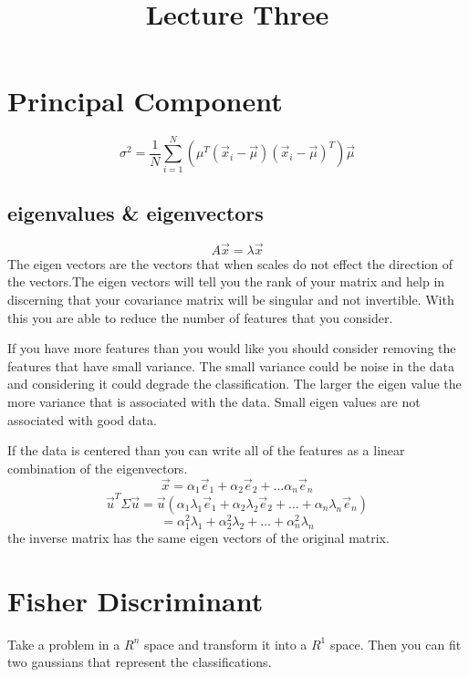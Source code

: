 \documentclass[letter, 9pt]{article}
\title{Lecture Three}
\begin{document}
\maketitle


\section{Principal Component}
\begin{equation}
\sigma^2 = \frac{1}{N}\sum_{i=1}^N(\mu^T(\vec{x}_i - \vec{\mu})(\vec{x}_i - \vec{\mu})^T)\vec{\mu}
\end{equation}
\subsection{eigenvalues \& eigenvectors}
\begin{equation}
A\vec{x} = \lambda \vec{x}
\end{equation}
The eigen vectors are the vectors that when scales do not effect the direction of the vectors.The eigen vectors will tell you the rank of your matrix and help in discerning that your covariance matrix will be singular and not invertible. With this you are able to reduce the number of features that you consider.

If you have more features than you would like you should consider removing the features that have small variance. The small variance could be noise in the data and considering it could degrade the classification. The larger the eigen value the more variance that is associated with the data. Small eigen values are not associated with good data.

If the data is centered than you can write all of the features as a linear combination of the eigenvectors.
\begin{equation}
\vec{x} = \alpha_1 \vec{e}_1 + \alpha_2 \vec{e}_2 + \dots \alpha_n \vec{e}_n
\end{equation}
\begin{equation}
\vec{u}^T \Sigma \vec{u} = \vec{u} (\alpha_1 \lambda_1 \vec{e}_1 + \alpha_2 \lambda_2 \vec{e}_2 + \dots + \alpha_n \lambda_n \vec{e}_n)
\end{equation}
\begin{equation}
= \alpha_1^2 \lambda_1 + \alpha_2^2 \lambda_2 + \dots + \alpha_n^2 \lambda_n
\end{equation}
the inverse matrix has the same eigen vectors of the original matrix.

\section{Fisher Discriminant}
Take a problem in a $R^n$ space and transform it into a $R^1$ space. Then you can fit two gaussians that represent the classifications.
\end{document}
